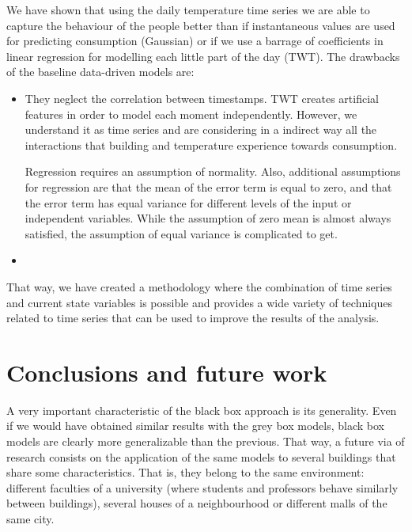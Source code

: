 \documentclass[10pt, conference, compsocconf]{IEEEtran}
\begin{document}

We have shown that using the daily temperature time series we are able to capture the behaviour of the people better than if instantaneous values are used for predicting consumption (Gaussian) or if we use a barrage of coefficients in linear regression for modelling each little part of the day (TWT). The drawbacks of the baseline data-driven models are:

\begin{itemize}
\item They neglect the correlation between timestamps. TWT creates artificial features in order to model each moment independently. However, we understand it as time series and are considering in a indirect way all the interactions that building and temperature experience towards consumption.

Regression requires an assumption of normality. Also, additional assumptions for regression are that the mean of the error term is equal to zero, and that the error term has equal variance for different levels of the input or independent variables. While the assumption of  zero mean is almost always satisfied, the assumption of equal variance is complicated to get. 


\item 
\end{itemize}


That way, we have created a methodology where the combination of time series and current state variables is possible and provides a wide variety of techniques related to time series that can be used to improve the results of the analysis.

\section{Conclusions and future work}

A very important characteristic of the black box approach is its generality. Even if we would have obtained similar results with the grey box models, black box models are clearly more generalizable than the previous. That way, a future via of research consists on the application of the same models to several buildings that share some characteristics. That is, they belong to the same environment: different faculties of a university (where students and professors behave similarly between buildings), several houses of a neighbourhood or different malls of the same city.
\end{document}
